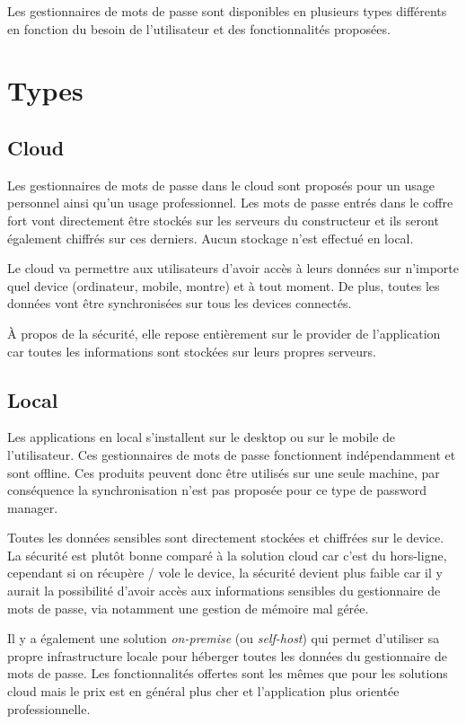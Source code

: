 Les gestionnaires de mots de passe sont disponibles en plusieurs types différents en fonction du besoin de l'utilisateur et des fonctionnalités proposées. 

\section{Types}

\subsection{Cloud}
Les gestionnaires de mots de passe dans le cloud sont proposés pour un usage personnel ainsi qu'un usage professionnel. Les mots de passe entrés dans le coffre fort vont directement être stockés sur les serveurs du constructeur et ils seront également chiffrés sur ces derniers. Aucun stockage n'est effectué en local.

Le cloud va permettre aux utilisateurs d'avoir accès à leurs données sur n'importe quel device (ordinateur, mobile, montre) et à tout moment. De plus, toutes les données vont être synchronisées sur tous les devices connectés.

À propos de la sécurité, elle repose entièrement sur le provider de l'application car toutes les informations sont stockées sur leurs propres serveurs.

\subsection{Local}
Les applications en local s'installent sur le desktop ou sur le mobile de l'utilisateur. Ces gestionnaires de mots de passe fonctionnent indépendamment et sont offline. Ces produits peuvent donc être utilisés sur une seule machine, par conséquence la synchronisation n'est pas proposée pour ce type de password manager. 

Toutes les données sensibles sont directement stockées et chiffrées sur le device. La sécurité est plutôt bonne comparé à la solution cloud car c'est du hors-ligne, cependant si on récupère / vole le device, la sécurité devient plus faible car il y aurait la possibilité d'avoir accès aux informations sensibles du gestionnaire de mots de passe, via notamment une gestion de mémoire mal gérée. 

Il y a également une solution \textit{on-premise} (ou \textit{self-host}) qui permet d'utiliser sa propre infrastructure locale pour héberger toutes les données du gestionnaire de mots de passe. Les fonctionnalités offertes sont les mêmes que pour les solutions cloud mais le prix est en général plus cher et l'application plus orientée professionnelle.

